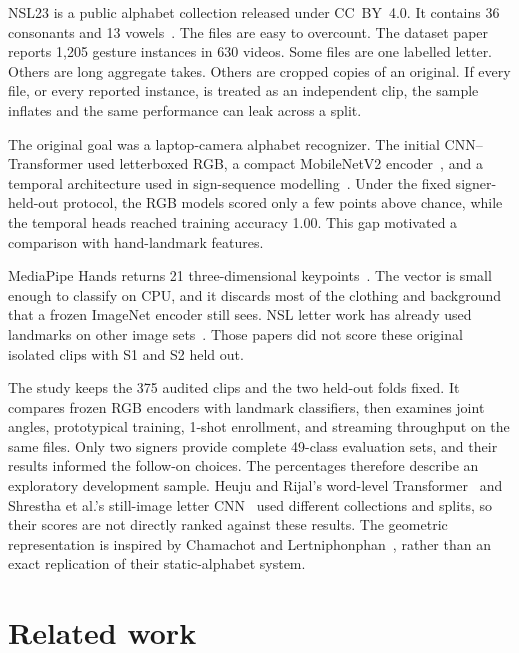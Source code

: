 \documentclass[11pt,a4paper]{article}
\begin{document}
NSL23 is a public alphabet collection released under CC~BY~4.0. It contains 36 consonants and 13 vowels~\cite{sunuwar2024nsl23,sunuwar2023zenodo}. The files are easy to overcount. The dataset paper reports 1,205 gesture instances in 630 videos. Some files are one labelled letter. Others are long aggregate takes. Others are cropped copies of an original. If every file, or every reported instance, is treated as an independent clip, the sample inflates and the same performance can leak across a split.

The original goal was a laptop-camera alphabet recognizer. The initial CNN--Transformer used letterboxed RGB, a compact MobileNetV2 encoder~\cite{sandler2018mobilenetv2}, and a temporal architecture used in sign-sequence modelling~\cite{camgoz2020sign,vaswani2017attention}. Under the fixed signer-held-out protocol, the RGB models scored only a few points above chance, while the temporal heads reached training accuracy 1.00. This gap motivated a comparison with hand-landmark features.

MediaPipe Hands returns 21 three-dimensional keypoints~\cite{zhang2020mediapipe}. The vector is small enough to classify on CPU, and it discards most of the clothing and background that a frozen ImageNet encoder still sees. NSL letter work has already used landmarks on other image sets~\cite{shrestha2024mediapipe}. Those papers did not score these original isolated clips with S1 and S2 held out.

The study keeps the 375 audited clips and the two held-out folds fixed. It compares frozen RGB encoders with landmark classifiers, then examines joint angles, prototypical training, 1-shot enrollment, and streaming throughput on the same files. Only two signers provide complete 49-class evaluation sets, and their results informed the follow-on choices. The percentages therefore describe an exploratory development sample. Heuju and Rijal's word-level Transformer~\cite{heuju2022word} and Shrestha et al.'s still-image letter CNN~\cite{shrestha2024mediapipe} used different collections and splits, so their scores are not directly ranked against these results. The geometric representation is inspired by Chamachot and Lertniphonphan~\cite{chamachot2026geometry}, rather than an exact replication of their static-alphabet system.

\section{Related work}
\end{document}

